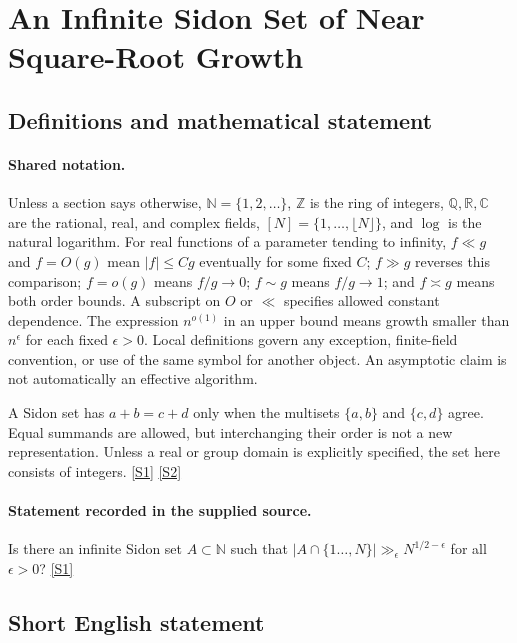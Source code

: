\documentclass[11pt,a4paper]{article}
\newcommand{\N}{\mathbb{N}}
\newcommand{\Z}{\mathbb{Z}}
\newcommand{\Q}{\mathbb{Q}}
\newcommand{\R}{\mathbb{R}}
\newcommand{\C}{\mathbb{C}}
\newcommand{\sref}[2]{\hyperlink{source:#1:#2}{[S#2]}}
\begin{document}
\section{An Infinite Sidon Set of Near Square-Root Growth}\label{statement}


\subsection{Definitions and mathematical statement}

\paragraph{Shared notation.}Unless a section says otherwise, $\N=\{1,2,\ldots\}$,
$\Z$ is the ring of integers, $\Q,\R,\C$ are the rational, real, and complex
fields, $[N]=\{1,\ldots,\lfloor N\rfloor\}$, and $\log$ is the natural
logarithm. For real functions of a parameter tending to infinity,
$f\ll g$ and $f=O(g)$ mean $|f|\leq Cg$ eventually for some fixed $C$;
$f\gg g$ reverses this comparison; $f=o(g)$ means $f/g\to0$;
$f\sim g$ means $f/g\to1$; and $f\asymp g$ means both order bounds.
A subscript on $O$ or $\ll$ specifies allowed constant dependence.
The expression $n^{o(1)}$ in an upper bound means growth smaller than
$n^\epsilon$ for each fixed $\epsilon>0$. Local definitions govern any
exception, finite-field convention, or use of the same symbol for another
object. An asymptotic claim is not automatically an effective algorithm.



A Sidon set has $a+b=c+d$ only when the multisets $\{a,b\}$ and $\{c,d\}$ agree. Equal summands are allowed, but interchanging their order is not a new representation. Unless a real or group domain is explicitly specified, the set here consists of integers. \sref{statement}{1} \sref{statement}{2}

\paragraph{Statement recorded in the supplied source.}
Is there an infinite Sidon set $A\subset \mathbb{N}$ such that $ \lvert A\cap \{1\ldots,N\}\rvert \gg_\epsilon N^{1/2-\epsilon} $ for all $\epsilon>0$? \sref{statement}{1}

\subsection{Short English statement}
\end{document}
